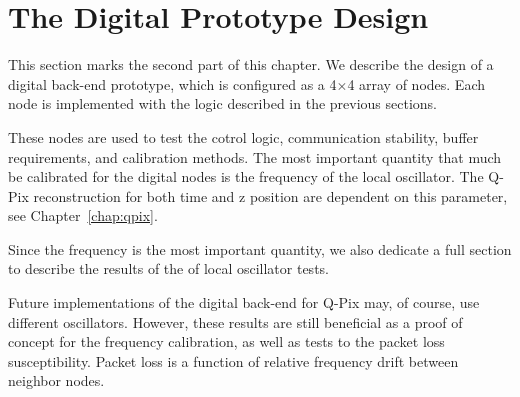 \section{The Digital Prototype Design}

This section marks the second part of this chapter.
We describe the design of a digital back-end prototype, which is configured as a 4$\times$4 array of nodes.
Each node is implemented with the logic described in the previous sections.

These nodes are used to test the cotrol logic, communication stability, buffer requirements, and calibration methods.
The most important quantity that much be calibrated for the digital nodes is the frequency of the local oscillator.
The Q-Pix reconstruction for both time and z position are dependent on this parameter, see Chapter~\ref{chap:qpix}.

Since the frequency is the most important quantity, we also dedicate a full section to describe the results of the of local oscillator tests.

Future implementations of the digital back-end for Q-Pix may, of course, use different oscillators.
However, these results are still beneficial as a proof of concept for the frequency calibration, as well as tests to the packet loss susceptibility.
Packet loss is a function of relative frequency drift between neighbor nodes.

